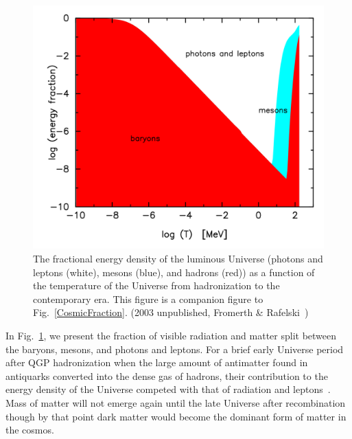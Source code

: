 \documentclass[universe,article,submit,moreauthors,pdftex,a4paper]{Definitions/mdpi}
\newcommand*{\rf}[1]{Fig.~{\ref{#1}}}
\newcommand*{\xblue}{\color{black}}
\begin{document}
\begin{figure}[ht]
\centering
\includegraphics[width=\textwidth]{./plots/hadron_content.png}
\caption{The fractional energy density of the luminous Universe (photons and leptons (white), mesons (blue), and hadrons (red)) as a function of the temperature of the Universe from hadronization to the contemporary era. This figure is a companion figure to \rf{CosmicFraction}. (2003 unpublished, Fromerth \& Rafelski~\cite{Rafelski:2019twp})}
\label{hadron_content}
\end{figure}

In \rf{hadron_content}, we present the fraction of visible radiation and matter split between the baryons, mesons, and photons and leptons. {\xblue For a brief early Universe period after QGP hadronization  when the large amount of antimatter found in antiquarks converted into the dense gas of hadrons, their contribution to the energy density of the Universe competed  with that of radiation and leptons~\cite{Rafelski:2019twp}. Mass of matter will not emerge again} until the late Universe after recombination though by that point dark matter would become the dominant form of matter in the cosmos.
\end{document}

